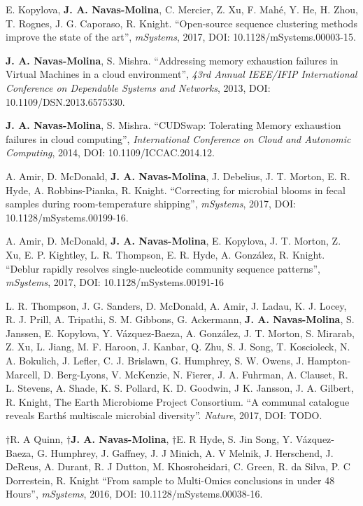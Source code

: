 \begin{frontmatter}
\begin{vitapage}
\begin{publications}
	\item E. Kopylova, \textbf{J. A. Navas-Molina}, C. Mercier, Z. Xu, F. Mah\'e, Y. He, H. Zhou, T. Rognes, J. G. Caporaso, R. Knight. ``Open-source sequence clustering methods improve the state of the art'', \emph{mSystems}, 2017, DOI: 10.1128/mSystems.00003-15.

	\item \textbf{J. A. Navas-Molina}, S. Mishra. ``Addressing memory exhaustion failures in Virtual Machines in a cloud environment'', \emph{43rd Annual IEEE/IFIP International Conference on Dependable Systems and Networks}, 2013, DOI: 10.1109/DSN.2013.6575330.

	\item \textbf{J. A. Navas-Molina}, S. Mishra. ``CUDSwap: Tolerating Memory exhaustion failures in cloud computing'', \emph{International Conference on Cloud and Autonomic Computing}, 2014, DOI: 10.1109/ICCAC.2014.12.

	\item A. Amir, D. McDonald, \textbf{J. A. Navas-Molina}, J. Debelius, J. T. Morton, E. R. Hyde, A. Robbins-Pianka, R. Knight. ``Correcting for microbial blooms in fecal samples during room-temperature shipping'', \emph{mSystems}, 2017, DOI: 10.1128/mSystems.00199-16.

	\item A. Amir, D. McDonald, \textbf{J. A. Navas-Molina}, E. Kopylova, J. T. Morton, Z. Xu, E. P. Kightley, L. R. Thompson, E. R. Hyde, A. Gonz\'alez, R. Knight. ``Deblur rapidly resolves single-nucleotide community sequence patterns'', \emph{mSystems}, 2017, DOI: 10.1128/mSystems.00191-16

	\item L. R. Thompson, J. G. Sanders, D. McDonald, A. Amir, J. Ladau, K. J. Locey, R. J. Prill, A. Tripathi, S. M. Gibbons, G. Ackermann, \textbf{J. A. Navas-Molina}, S. Janssen, E. Kopylova, Y. V\'azquez-Baeza, A. Gonz\'alez, J. T. Morton, S. Mirarab, Z. Xu, L. Jiang, M. F. Haroon, J. Kanbar, Q. Zhu, S. J. Song, T. Koscioleck, N. A. Bokulich, J. Lefler, C. J. Brislawn, G. Humphrey, S. W. Owens, J. Hampton-Marcell, D. Berg-Lyons, V. McKenzie, N. Fierer, J. A. Fuhrman, A. Clauset, R. L. Stevens, A. Shade, K. S. Pollard, K. D. Goodwin, J K. Jansson, J. A. Gilbert, R. Knight, The Earth Microbiome Project Consortium. ``A communal catalogue reveals Earth\'s multiscale microbial diversity''. \emph{Nature}, 2017, DOI: TODO.

	\item $\dagger$R. A Quinn, \textbf{$\dagger$J. A. Navas-Molina}, $\dagger$E. R Hyde, S. Jin Song, Y. V\'azquez-Baeza, G. Humphrey, J. Gaffney, J. J Minich, A. V Melnik, J. Herschend, J. DeReus, A. Durant, R. J Dutton, M. Khosroheidari, C. Green, R. da Silva, P. C Dorrestein, R. Knight ``From sample to Multi-Omics conclusions in under 48 Hours'', \emph{mSystems}, 2016, DOI: 10.1128/mSystems.00038-16.


\end{publications}
\end{vitapage}
\end{frontmatter}
